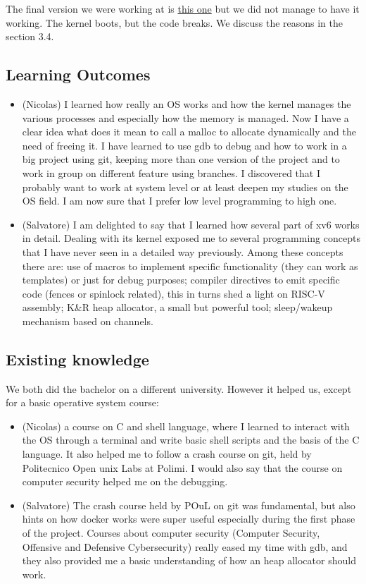 \documentclass{article}
\begin{document}
The final version we were working at is \href{inserire link alla final version}{this one} but we did not manage to have it working. The kernel boots, but the code breaks. We discuss the reasons in the section 3.4.


\subsection{Learning Outcomes}

\begin{itemize}
    \item (Nicolas) I learned how really an OS works and how the kernel manages the various processes and especially how the memory is managed. 
    Now I have a clear idea what does it mean to call a malloc to allocate  dynamically and the need of freeing it. 
    I have learned to use gdb to debug and how to work in a big project using git, keeping more than one version of the project and to work in group on different feature using branches. 
    I discovered that I probably want to work at system level or at least deepen my studies on the OS field. 
    I am now sure that I prefer low level programming to high one.
    \item (Salvatore)
    I am delighted to say that I learned how several part of xv6 works in detail. 
    Dealing with its kernel exposed me to several programming concepts that I have never seen in a detailed way previously. 
    Among these concepts there are: use of macros to implement specific functionality (they can work as templates) or just for debug purposes; 
    compiler directives to emit specific code (fences or spinlock related), this in turns shed a light on RISC-V assembly;
    K&R heap allocator, a small but powerful tool; sleep/wakeup mechanism based on channels.
\end{itemize}

 

\subsection{Existing knowledge}

We both did the bachelor on a different university. However it helped us, except for a basic operative system course:
\begin{itemize}
    \item (Nicolas) a course on C and shell language, where I learned to interact with the OS through a terminal and write basic shell scripts and the basis of the C language. It also helped me to follow a crash course on git, held by Politecnico Open unix Labs at Polimi. 
    I would also say that the course on computer security helped me on the debugging.
    \item(Salvatore) The crash course held by POuL on git was fundamental, but also hints on how docker works were super useful especially during the first phase of the project.
    Courses about computer security (Computer Security, Offensive and Defensive Cybersecurity) really eased my time with gdb, 
    and they also provided me a basic understanding of how an heap allocator should work.  
\end{itemize}
\end{document}
